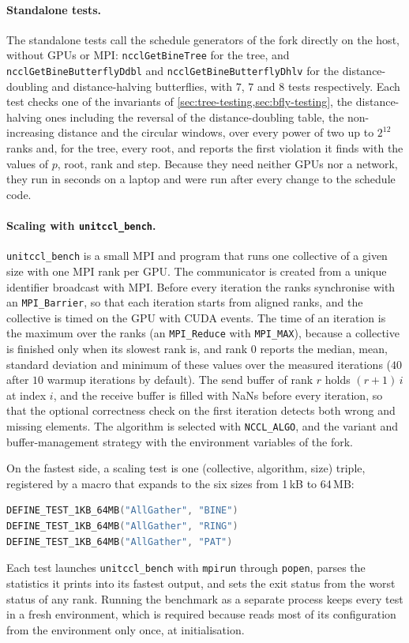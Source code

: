 \paragraph{Standalone tests.}
The standalone tests call the schedule generators of the fork directly on the host, without GPUs or MPI: \texttt{ncclGetBineTree} for the tree, and \texttt{ncclGetBineButterflyDdbl} and \texttt{ncclGetBineButterflyDhlv} for the distance-doubling and distance-halving butterflies, with $7$, $7$ and $8$ tests respectively.
Each test checks one of the invariants of \cref{sec:tree-testing,sec:bfly-testing}, the distance-halving ones including the reversal of the distance-doubling table, the non-increasing distance and the circular windows, over every power of two up to $2^{12}$ ranks and, for the tree, every root, and reports the first violation it finds with the values of $p$, root, rank and step.
Because they need neither GPUs nor a network, they run in seconds on a laptop and were run after every change to the schedule code.

\paragraph{Scaling with \texttt{unitccl\_bench}.}
\texttt{unitccl\_bench} is a small MPI and \nccl{} program that runs one collective of a given size with one MPI rank per GPU.
The \nccl{} communicator is created from a unique identifier broadcast with MPI.
Before every iteration the ranks synchronise with an \texttt{MPI\_Barrier}, so that each iteration starts from aligned ranks, and the collective is timed on the GPU with CUDA events.
The time of an iteration is the maximum over the ranks (an \texttt{MPI\_Reduce} with \texttt{MPI\_MAX}), because a collective is finished only when its slowest rank is, and rank $0$ reports the median, mean, standard deviation and minimum of these values over the measured iterations ($40$ after $10$ warmup iterations by default).
The send buffer of rank $r$ holds $(r+1)\,i$ at index $i$, and the receive buffer is filled with NaNs before every iteration, so that the optional correctness check on the first iteration detects both wrong and missing elements.
The algorithm is selected with \texttt{NCCL\_ALGO}, and the \bine{} variant and buffer-management strategy with the environment variables of the fork.

On the fastest side, a scaling test is one (collective, algorithm, size) triple, registered by a macro that expands to the six sizes from 1\,kB to 64\,MB:
\begin{lstlisting}[language=C, numbers=none]
DEFINE_TEST_1KB_64MB("AllGather", "BINE")
DEFINE_TEST_1KB_64MB("AllGather", "RING")
DEFINE_TEST_1KB_64MB("AllGather", "PAT")
\end{lstlisting}
Each test launches \texttt{unitccl\_bench} with \texttt{mpirun} through \texttt{popen}, parses the statistics it prints into its fastest output, and sets the exit status from the worst status of any rank.
Running the benchmark as a separate process keeps every test in a fresh \nccl{} environment, which is required because \nccl{} reads most of its configuration from the environment only once, at initialisation.

